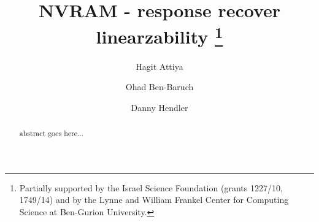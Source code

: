 \begin{titlepage}
	
	\title{NVRAM - response recover linearzability \thanks{
		Partially supported by the Israel Science Foundation
		(grants 1227/10, 1749/14) and by the Lynne and William Frankel Center for Computing Science at Ben-Gurion University.}}
	
	
	\author[1]{Hagit Attiya}
	\author[2]{Ohad Ben-Baruch}
	\author[3]{Danny Hendler}
	
	\maketitle




\begin{abstract}
	abstract goes here...



\end{abstract}


\maketitle \thispagestyle{empty}
\end{titlepage}